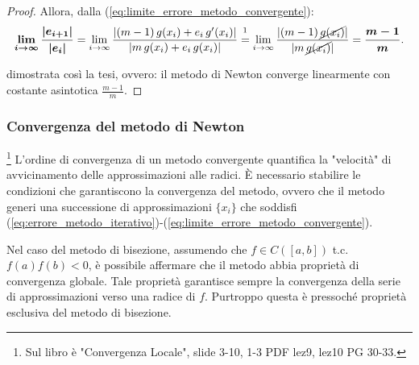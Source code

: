 \begin{proof}
	
	
	
	\noindent Allora, dalla (\ref{eq:limite_errore_metodo_convergente}):
	\begin{equation} \label{eq:limCostanteAsistotica}
		\boldsymbol{\lim_{i\to\infty}{\frac{|e_{i+1}|}{|e_i|}}}=\lim_{i\to\infty}{\frac{|(m-1)\,g(x_i)+e_i\,g'(x_i)|}{|m\,g(x_i)+e_i\,g(x_i)|}}\overset{\footnotemark}{=}\lim_{i\to\infty}{\frac{|(m-1)\,\cancel{g(x_i)}|}{|m\,\cancel{g(x_i)}|}}=\boldsymbol{\frac{m-1}{m}}.
	\end{equation}
	
	
	 dimostrata così la tesi, ovvero: il metodo di Newton converge linearmente con costante asintotica $\frac{m-1}{m}$.
\end{proof}

\subsubsection{Convergenza del metodo di Newton}\footnote{Sul libro è "Convergenza Locale", slide 3-10, 1-3 PDF lez9, lez10 PG 30-33.} 
L'ordine di convergenza di un metodo convergente quantifica la "velocità" di avvicinamento delle approssimazioni alle radici. È necessario stabilire le condizioni che garantiscono la convergenza del metodo, ovvero che il metodo generi una successione di approssimazioni $\{x_i\}$ che soddisfi (\ref{eq:errore_metodo_iterativo})-(\ref{eq:limite_errore_metodo_convergente}).

Nel caso del metodo di bisezione, assumendo che $f\in C([a,b])$ t.c. $f(a)f(b)<0$, è possibile affermare che il metodo abbia proprietà di convergenza globale. Tale proprietà garantisce sempre la convergenza della serie di approssimazioni verso una radice di $f$. Purtroppo questa è pressoché proprietà esclusiva del metodo di bisezione.

